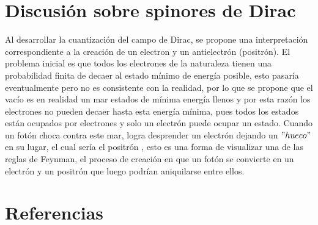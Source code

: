 \documentclass{article}
\begin{document}
\section{Discusión sobre spinores de Dirac}
Al desarrollar la cuantización del campo de Dirac, se propone una interpretación correspondiente a la creación de un electron y un antielectrón (positrón). El problema inicial es que todos los electrones de la naturaleza tienen una probabilidad finita de decaer al estado mínimo de energía posible, esto pasaría eventualmente pero no es consistente con la realidad, por lo que se propone que el vacío es en realidad un mar estados de mínima energía llenos y por esta razón los electrones no pueden decaer hasta esta energía mínima, pues todos los estados están ocupados por electrones y solo un electrón puede ocupar un estado. Cuando un fotón choca contra este mar, logra desprender un electrón dejando un $"hueco"$ en su lugar, el cual sería el positrón \cite{Kaku:1993}, esto es una forma de visualizar una de las reglas de Feynman, el proceso de creación en que un fotón se convierte en un electrón y un positrón \cite{Restrepo:2020} que luego podrían aniquilarse entre ellos.

\section{Referencias}



\end{document}
